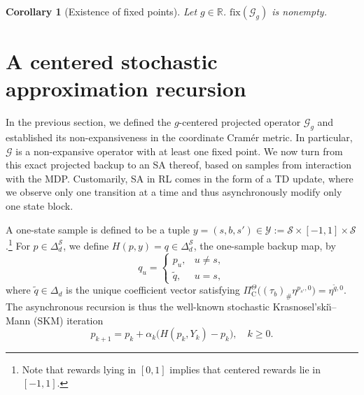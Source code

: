 \documentclass{article}
\newtheorem{corollary}[theorem]{Corollary}
\newcommand{\X}{\mathcal{S}}
\newcommand{\R}{\mathbb{R}}
\begin{document}
\begin{corollary}[Existence of fixed points]\label{corol:fixed-points}
Let $g \in \R$. $\mathrm{fix}(\mathcal G_g)$ is nonempty.
\end{corollary}

\section{A centered stochastic approximation recursion}\label{sec:centered}
In the previous section, we defined the $g$-centered projected operator $\mathcal G_g$ and established its non-expansiveness in the coordinate Cram\'er metric. In particular, $\mathcal G$ is a non-expansive operator with at least one fixed point. We now turn from this exact projected backup to an SA thereof, based on samples from interaction with the MDP. Customarily, SA in RL comes in the form of a TD update, where we observe only one transition at a time and thus asynchronously modify only one state block.

A one-state sample is defined to be a tuple $y = (s, b, s') \in \mathcal Y := \X \times [-1, 1] \times \X$.\footnote{Note that rewards lying in $[0, 1]$ implies that centered rewards lie in $[-1, 1]$.} For $p \in \Delta^\X_d$, we define $H(p ,y) = q \in \Delta^\X_d$, the one-sample backup map, by
\begin{equation}\label{eq:one-sample-backup}
q_u = \begin{cases}
p_u, &u\ne s,\\
\tilde q, &u=s,
\end{cases}
\end{equation}
where $\tilde q \in \Delta_d$ is the unique coefficient vector satisfying $\Pi^\Theta_{\mathrm C}\bigl( (\tau_b)_\# \eta ^{p_{s'}, 0}\bigr) = \eta^{\tilde q, 0}$. The asynchronous recursion is thus the well-known stochastic Krasnosel'ski\u{\i}--Mann (SKM) iteration \citep{krasnosel1955two, mann1953mean} 
\begin{equation}\label{eq:KM}
p_{k+1} = p_k + \alpha_k \bigl(H(p_k, Y_k) - p_k\bigr),\quad k\ge0.
\end{equation}
\end{document}
